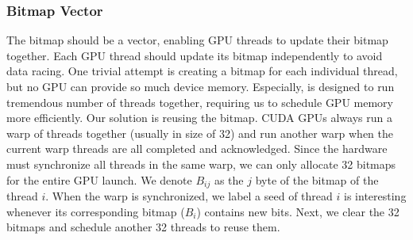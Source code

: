 


\subsubsection{Bitmap Vector}
\label{sec:translator:bitmap}

The bitmap should be a vector, enabling GPU threads to update their bitmap together.
Each GPU thread should update its bitmap independently to avoid data racing. One trivial attempt is creating a bitmap for each individual thread, but no GPU can provide so much device memory.
Especially, {\tool} is designed to run tremendous number of threads together, requiring us to schedule GPU memory more efficiently. 
Our solution is reusing the bitmap.
CUDA GPUs always run a warp of threads together (usually in size of 32) and run another warp when the current warp threads are all completed and acknowledged\cite{nvidia2021cuda}. Since the hardware must synchronize all threads in the same warp, we can only allocate 32 bitmaps for the entire GPU launch. 
We denote $B_{ij}$ as the $j$ byte of the bitmap of the thread $i$.
When the warp is synchronized, we label a seed of thread $i$ is interesting whenever its corresponding bitmap ($B_i$) contains new bits. Next, we clear the 32 bitmaps and schedule another 32 threads to reuse them.
%


